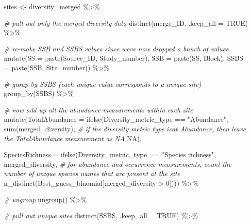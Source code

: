 \documentclass[
]{article}
\newenvironment{Shaded}{\begin{snugshade}}{\end{snugshade}}
\newcommand{\AttributeTok}[1]{\textcolor[rgb]{0.77,0.63,0.00}{#1}}
\newcommand{\CommentTok}[1]{\textcolor[rgb]{0.56,0.35,0.01}{\textit{#1}}}
\newcommand{\ConstantTok}[1]{\textcolor[rgb]{0.00,0.00,0.00}{#1}}
\newcommand{\DecValTok}[1]{\textcolor[rgb]{0.00,0.00,0.81}{#1}}
\newcommand{\FunctionTok}[1]{\textcolor[rgb]{0.00,0.00,0.00}{#1}}
\newcommand{\NormalTok}[1]{#1}
\newcommand{\OtherTok}[1]{\textcolor[rgb]{0.56,0.35,0.01}{#1}}
\newcommand{\SpecialCharTok}[1]{\textcolor[rgb]{0.00,0.00,0.00}{#1}}
\newcommand{\StringTok}[1]{\textcolor[rgb]{0.31,0.60,0.02}{#1}}
\begin{document}
\begin{Shaded}
\begin{Highlighting}[]
\NormalTok{sites }\OtherTok{\textless{}{-}}\NormalTok{ diversity\_merged }\SpecialCharTok{\%\textgreater{}\%}
  
  \CommentTok{\# pull out only the merged diversity data}
  \FunctionTok{distinct}\NormalTok{(merge\_ID, }\AttributeTok{.keep\_all =} \ConstantTok{TRUE}\NormalTok{) }\SpecialCharTok{\%\textgreater{}\%}
  
  \CommentTok{\# re{-}make SSB and SSBS values since we\textquotesingle{}ve now dropped a bunch of values}
  \FunctionTok{mutate}\NormalTok{(}\AttributeTok{SS =} \FunctionTok{paste}\NormalTok{(Source\_ID, Study\_number),}
         \AttributeTok{SSB =} \FunctionTok{paste}\NormalTok{(SS, Block),}
         \AttributeTok{SSBS =} \FunctionTok{paste}\NormalTok{(SSB, Site\_number)) }\SpecialCharTok{\%\textgreater{}\%}
  
  \CommentTok{\# group by SSBS (each unique value corresponds to a unique site)}
  \FunctionTok{group\_by}\NormalTok{(SSBS) }\SpecialCharTok{\%\textgreater{}\%}
  
  \CommentTok{\# now add up all the abundance measurements within each site}
  \FunctionTok{mutate}\NormalTok{(}\AttributeTok{TotalAbundance =} \FunctionTok{ifelse}\NormalTok{(Diversity\_metric\_type }\SpecialCharTok{==} \StringTok{"Abundance"}\NormalTok{,}
                                 \FunctionTok{sum}\NormalTok{(merged\_diversity),}
                                 \CommentTok{\# if the diversity metric type isn\textquotesingle{}t Abundance, then leave the TotalAbundance measurement as NA}
                                 \ConstantTok{NA}\NormalTok{),}
         
         \AttributeTok{SpeciesRichness =} \FunctionTok{ifelse}\NormalTok{(Diversity\_metric\_type }\SpecialCharTok{==} \StringTok{"Species richness"}\NormalTok{,}
\NormalTok{                                  merged\_diversity,}
                                  \CommentTok{\# for abundance and occurrence measurements, count the number of unique species names that are present at the site }
                                  \FunctionTok{n\_distinct}\NormalTok{(Best\_guess\_binomial[merged\_diversity }\SpecialCharTok{\textgreater{}} \DecValTok{0}\NormalTok{]))) }\SpecialCharTok{\%\textgreater{}\%}
  
  \CommentTok{\# ungroup}
  \FunctionTok{ungroup}\NormalTok{() }\SpecialCharTok{\%\textgreater{}\%}
  
  \CommentTok{\# pull out unique sites}
  \FunctionTok{distinct}\NormalTok{(SSBS, }\AttributeTok{.keep\_all =} \ConstantTok{TRUE}\NormalTok{) }\SpecialCharTok{\%\textgreater{}\%}
  

\end{Highlighting}
\end{Shaded}
\end{document}
